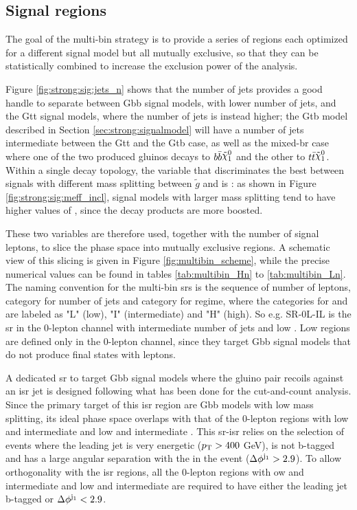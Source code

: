 \subsection*{Signal regions}

The goal of the multi-bin strategy is to provide a series of regions each optimized for a different signal model 
but all mutually exclusive, so that they can be statistically combined to increase the exclusion power of the analysis.

Figure \ref{fig:strong:sig:jets_n} shows that the number of jets provides a good handle to separate 
between Gbb signal models, with lower number of jets, and the Gtt signal models, where the number of jets is instead higher;
the Gtb model described in Section \ref{sec:strong:signalmodel} will have a number of jets intermediate between the Gtt and the Gtb case, 
as well as the mixed-\gls{br} case where one of the two produced gluinos decays to $b \bar{b} \ninoone$ and the other to 
$t \bar{t} \ninoone$.
Within a single decay topology, the variable that discriminates the best between signals with different mass splitting between $\tilde{g}$ and
\ninoone is \meff: as shown in Figure \ref{fig:strong:sig:meff_incl}, signal models with larger mass splitting tend to have higher values 
of \meff, since the decay products are more boosted. 

These two variables are therefore used, together with the number of signal leptons, to slice the phase space into mutually exclusive regions. 
A schematic view of this slicing is given in Figure \ref{fig:multibin_scheme}, while the precise numerical values can be found 
in tables \ref{tab:multibin_Hn} to \ref{tab:multibin_Ln}.
The naming convention for the multi-bin \glspl{sr} is the sequence of number of leptons, category for number of jets and category for \meff regime,
where the categories for \njet and \meff are labeled as "L" (low), "I" (intermediate) and "H" (high). So e.g. SR-0L-IL is the \gls{sr} in the 0-lepton channel with intermediate number of jets and low \meff. Low \meff regions are defined only in the 0-lepton channel, since they 
target Gbb signal models that do not produce final states with leptons. 

A dedicated \gls{sr} to target Gbb signal models where the gluino pair recoils against an \gls{isr} jet is designed following 
what has been done for the cut-and-count analysis. 
Since the primary target of this \gls{isr} region are Gbb models with low mass splitting, its ideal phase space 
overlaps with that of the 0-lepton regions with low and intermediate \njet and low and intermediate \meff. 
This \gls{sr}-\gls{isr} relies on the selection of events where the leading jet is very energetic ($p_{\rm T} > 400$ GeV),
 is not b-tagged and has a large angular separation with the \met in the event (${\Delta}\phi^{\mathrm{j}_1} > 2.9$). 
To allow orthogonality with the \gls{isr} regions, all the 0-lepton regions with ow and intermediate \njet and low and intermediate \meff
are required to have either the leading jet b-tagged or ${\Delta}\phi^{\mathrm{j}_1} < 2.9$. 

